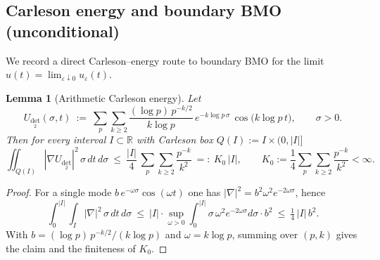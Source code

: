 \documentclass[11pt]{article}
\newtheorem{lemma}[theorem]{Lemma}
\theoremstyle{definition}
\theoremstyle{remark}
\newcommand{\R}{\mathbb{R}}
\begin{document}
\subsection*{Carleson energy and boundary BMO (unconditional)}
We record a direct Carleson–energy route to boundary BMO for the limit $u(t)=\lim_{\varepsilon\downarrow 0}u_\varepsilon(t)$.

\begin{lemma}[Arithmetic Carleson energy]\label{lem:carleson-arith}
Let
\[
 U_{\det_2}(\sigma,t)\ :=\ \sum_{p}\sum_{k\ge 2}\frac{(\log p)\,p^{-k/2}}{k\log p}\,e^{-k\log p\,\sigma}\,\cos\big(k\log p\,t\big),\qquad \sigma>0.
\]
Then for every interval $I\subset\R$ with Carleson box $Q(I):=I\times(0,|I|]$
\[
 \iint_{Q(I)} |\nabla U_{\det_2}|^2\,\sigma\,dt\,d\sigma\ \le\ \frac{|I|}{4}\,\sum_{p}\sum_{k\ge 2}\frac{p^{-k}}{k^2}
 \ =:\ K_0\,|I|,\qquad K_0:=\frac{1}{4}\sum_{p}\sum_{k\ge 2}\frac{p^{-k}}{k^2}<\infty.
\]
\end{lemma}
\begin{proof}
For a single mode $b\,e^{-\omega\sigma}\cos(\omega t)$ one has $|\nabla|^2=b^2\omega^2e^{-2\omega\sigma}$, hence
\[
 \int_0^{|I|}\!\int_I |\nabla|^2\,\sigma\,dt\,d\sigma\ \le\ |I|\cdot\sup_{\omega>0}\int_0^{|I|}\sigma\,\omega^2e^{-2\omega\sigma}d\sigma\cdot b^2\ \le\ \tfrac14\,|I|\,b^2.
\]
With $b=(\log p)\,p^{-k/2}/(k\log p)$ and $\omega=k\log p$, summing over $(p,k)$ gives the claim and the finiteness of $K_0$.
\end{proof}
\end{document}
